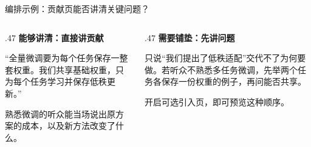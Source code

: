 \documentclass[aspectratio=169,t]{beamer}
\begin{document}
\renewcommand{\appendixname}{附录}
\appendix
\begin{frame}{编排示例：贡献页能否讲清关键问题？}
  \begin{columns}[T,onlytextwidth]
    \begin{column}{.47\textwidth}
      \textbf{能够讲清：直接讲贡献}\par\medskip
      “全量微调要为每个任务保存一整套权重。我们共享基础权重，只为每个任务学习并保存低秩更新。”\par\medskip
      熟悉微调的听众能当场说出原方案的成本，以及新方法改变了什么。
    \end{column}
    \begin{column}{.47\textwidth}
      \textbf{需要铺垫：先讲问题}\par\medskip
      只说“我们提出了低秩适配”交代不了为何要做。若听众不熟悉多任务微调，先举两个任务各保存一份权重的例子，再问能否共享。\par\medskip
      开启可选引入页，即可预览这种顺序。
    \end{column}
  \end{columns}
\end{frame}
\end{document}
